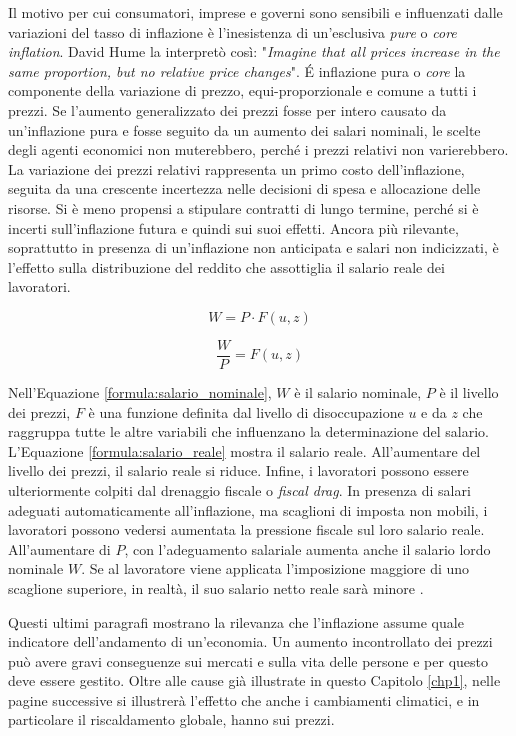 Il motivo per cui consumatori, imprese e governi sono sensibili e influenzati dalle variazioni del tasso di inflazione è l'inesistenza di un'esclusiva \textit{pure} o \textit{core} \textit{inflation}. David Hume la interpretò così: "\textit{Imagine that all prices increase in the same proportion, but no relative price changes}". \'E inflazione pura o \textit{core} la componente della variazione di prezzo, equi-proporzionale e comune a tutti i prezzi. Se l'aumento generalizzato dei prezzi fosse per intero causato da un'inflazione pura e fosse seguito da un aumento dei salari nominali, le scelte degli agenti economici non muterebbero, perché i prezzi relativi non varierebbero. La variazione dei prezzi relativi rappresenta un primo costo dell'inflazione, seguita da una crescente incertezza nelle decisioni di spesa e allocazione delle risorse. Si è meno propensi a stipulare contratti di lungo termine, perché si è incerti sull'inflazione futura e quindi sui suoi effetti. Ancora più rilevante, soprattutto in presenza di un'inflazione non anticipata e salari non indicizzati, è l'effetto sulla distribuzione del reddito che assottiglia il salario reale dei lavoratori.
	
\begin{equation}
	\label{formula:salario_nominale}
	W = P\cdot F(u,z)
\end{equation}

\begin{equation}
	\label{formula:salario_reale}
	\frac{W}{P} = F(u,z)
\end{equation}

Nell'Equazione \ref{formula:salario_nominale}, $W$ è il salario nominale, $P$ è il livello dei prezzi, $F$ è una funzione definita dal livello di disoccupazione $u$ e da $z$ che raggruppa tutte le altre variabili che influenzano la determinazione del salario. L'Equazione \ref{formula:salario_reale} mostra il salario reale. All'aumentare del livello dei prezzi, il salario reale si riduce. Infine, i lavoratori possono essere ulteriormente colpiti dal drenaggio fiscale o \textit{fiscal drag}. In presenza di salari adeguati automaticamente all'inflazione, ma scaglioni di imposta non mobili, i lavoratori possono vedersi aumentata la pressione fiscale sul loro salario reale. All'aumentare di $P$, con l'adeguamento salariale aumenta anche il salario lordo nominale $W$. Se al lavoratore viene applicata l'imposizione maggiore di uno scaglione superiore, in realtà, il suo salario netto reale sarà minore \parencite{Blanchard_macroeconomia}.

Questi ultimi paragrafi mostrano la rilevanza che l'inflazione assume quale indicatore dell'andamento di un'economia. Un aumento incontrollato dei prezzi può avere gravi conseguenze sui mercati e sulla vita delle persone e per questo deve essere gestito. Oltre alle cause già illustrate in questo Capitolo \ref{chp1}, nelle pagine successive si illustrerà l'effetto che anche i cambiamenti climatici, e in particolare il riscaldamento globale, hanno sui prezzi.